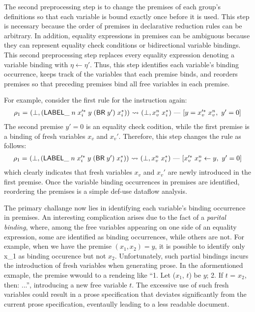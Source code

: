 \medskip
The second preprocessing step is to change the premises of each group's definitions
so that each variable is bound exactly once before it is used.
This step is necessary because the order of premises in declarative reduction rules
can be arbitrary.
In addition, equality expressions in premises can be ambiguous because they can represent equality check conditions or bidirectional variable bindings.
This second preprocessing step replaces every equality expression denoting a variable binding with $\eta \leftarrow \eta'$.
Thus, this step identifies each variable's binding occurrence,
keeps track of the variables that each premise binds,
and reorders premises so that preceding premises bind all free variables in each premise.

For example, consider the first rule for the  instruction again:
\[
\begin{array}{l@{~}l@{~}c@{~}l}
\rho_1 = &(\bot, (\ssf{LABEL\_} \; n \; x_i'^*\; y\; (\ssf{BR}\; y')\; x_i^*)) &\leadsto&
 (\bot, x_v^{n}\; x_i^*)\ \mbox{---}\ [y = x_v'^*\; x_v^{n},\ y' = 0]\\
\end{array}
\]
The second premise $y' = 0$ is an equality check codition,
while the first premise is a binding of fresh variables $x_v$ and $x_v'$.
Therefore, this step changes the rule as follows:
\[
\begin{array}{l@{~}l@{~}c@{~}l}
\rho_1 = &(\bot, (\ssf{LABEL\_} \; n \; x_i'^*\; y\; (\ssf{BR}\; y')\; x_i^*)) &\leadsto&
 (\bot, x_v^{n}\; x_i^*)\ \mbox{---}\ [x_v'^*\; x_v^{n} \leftarrow y,\ y' = 0]\\
\end{array}
\]
which clearly indicates that fresh variables $x_v$ and $x_v'$ are newly introduced in the first premise.
Once the variable binding occurrences in premises are identified,
reordering the premises is a simple def-use dataflow analysis.

The primary challange now lies in identifying each variable's binding occurrence in premises.
An interesting complication arises due to the fact of a \textit{parital
binding}, where, among the free variables appearing on one side of an equality
expression, some are identified as binding occurrences, while others are not.
For example, when we have the premise $(x_1, x_2) = y$, it is possible to
identify only x_1 as binding occurence but not $x_2$.
Unfortunately, such partial bindings incurs the introduction
of fresh variables when generating prose. In the aformentioned exmaple,
the premise wwould to a rendeing like ``1. Let ($x_1$, $t$) be $y$; 2. If $t$ =
$x_2$, then: ...'', introducing a new free variable $t$.  The excessive use of such
fresh variables could result in a prose specification that deviates significantly from the
current prose specification, eventaully leading to a less readable document.

